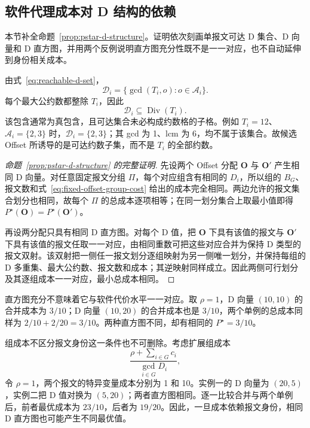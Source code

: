 \documentclass[UTF8,a4paper,twoside,zihao=-4]{ctexart}
\numberwithin{equation}{section}
\numberwithin{figure}{section}
\numberwithin{table}{section}
\theoremstyle{definition}
\newcommand{\Oset}{\mathcal{A}}
\numberwithin{algocf}{section}
\begin{document}
\subsection{软件代理成本对 D 结构的依赖}
\label{subsec:appendix-d-structure-proof}

本节补全命题~\ref{prop:pstar-d-structure}。证明依次刻画单报文可达 D 集合、D 向量和 D 直方图，并用两个反例说明直方图充分性既不是一一对应，也不自动延伸到身份相关成本。

由式~\eqref{eq:reachable-d-set}，
\begin{equation}
 \mathcal D_i=\{\gcd(T_i,o):o\in\Oset_i\}.
\end{equation}
每个最大公约数都整除 $T_i$，因此
\begin{equation}
 \mathcal D_i\subseteq\operatorname{Div}(T_i).
\label{eq:appendix-reachable-divisor-subset}
\end{equation}
该包含通常为真包含，且可达集合未必构成约数格的子格。例如 $T_i=12$、$\Oset_i=\{2,3\}$ 时，$\mathcal D_i=\{2,3\}$；其 gcd 为 1、lcm 为 6，均不属于该集合。故候选 Offset 所诱导的是可达约数子集，而不是 $T_i$ 的全部约数。

\begin{proof}[命题~\ref{prop:pstar-d-structure} 的完整证明]
先设两个 Offset 分配 $\boldsymbol O$ 与 $\boldsymbol O'$ 产生相同 D 向量。对任意固定报文分组 $\Pi$，每个对应组含有相同的 $D_i$，所以组的 $B_G$、报文数和式~\eqref{eq:fixed-offset-group-cost} 给出的成本完全相同。两边允许的报文集合划分也相同，故每个 $\Pi$ 的总成本逐项相等；在同一划分集合上取最小值即得 $P^\star(\boldsymbol O)=P^\star(\boldsymbol O')$。

再设两分配只具有相同 D 直方图。对每个 D 值，把 $\boldsymbol O$ 下具有该值的报文与 $\boldsymbol O'$ 下具有该值的报文任取一一对应，由相同重数可把这些对应合并为保持 D 类型的报文双射。该双射把一侧任一报文划分逐组映射为另一侧唯一划分，并保持每组的 D 多重集、最大公约数、报文数和成本；其逆映射同样成立。因此两侧可行划分及其逐组成本一一对应，最小总成本相同。
\end{proof}

直方图充分不意味着它与软件代价水平一一对应。取 $\rho=1$，D 向量 $(10,10)$ 的合并成本为 $3/10$；D 向量 $(10,20)$ 的合并成本也是 $3/10$，两个单例的总成本同样为 $2/10+2/20=3/10$。两种直方图不同，却有相同的 $P^\star=3/10$。

组成本不区分报文身份这一条件也不可删除。考虑扩展组成本
\begin{equation}
 \frac{\rho+\sum_{i\in G}c_i}{\gcd_{i\in G}D_i},
\label{eq:appendix-identity-specific-cost}
\end{equation}
令 $\rho=1$，两个报文的特异变量成本分别为 1 和 10。实例一的 D 向量为 $(20,5)$，实例二把 D 值对换为 $(5,20)$；两者直方图相同。逐一比较合并与两个单例后，前者最优成本为 $23/10$，后者为 $19/20$。因此，一旦成本依赖报文身份，相同 D 直方图也可能产生不同最优值。
\end{document}
